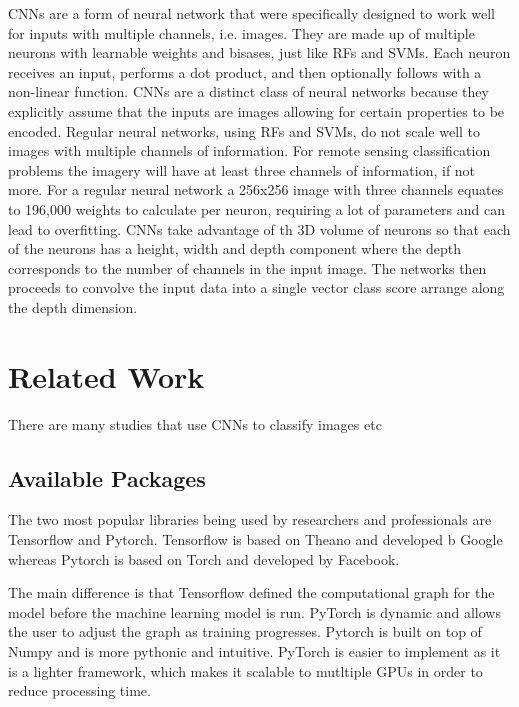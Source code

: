  \par
 CNNs are a form of neural network that were specifically designed to work well for inputs with multiple channels, i.e. images. They are made up of multiple neurons with learnable weights and bisases, just like RFs and SVMs. Each neuron receives an input, performs a dot product, and then optionally follows with a non-linear function. CNNs are a distinct class of neural networks because they explicitly assume that the inputs are images allowing for certain properties to be encoded. Regular neural networks, using RFs and SVMs, do not scale well to images with multiple channels of information. For remote sensing classification problems the imagery will have at least three channels of information, if not more. For a regular neural network a 256x256 image with three channels equates to 196,000 weights to calculate per neuron, requiring a lot of parameters and can lead to overfitting. CNNs take advantage of th 3D volume of neurons so that each of the neurons has a height, width and depth component where the depth corresponds to the number of channels in the input image. The networks then proceeds to convolve the input data into a single vector class score arrange along the depth dimension. 

\section*{Related Work}
There are many studies that use CNNs to classify images etc
\subsection*{Available Packages}
The two most popular libraries being used by researchers and professionals are Tensorflow and Pytorch. Tensorflow is based on Theano and developed b Google whereas Pytorch is based on Torch and developed by Facebook.
\par
The main difference is that Tensorflow defined the computational graph for the model before the machine learning model is run. PyTorch is dynamic and allows the user to adjust the graph as training progresses. Pytorch is built on top of Numpy and is more pythonic and intuitive. PyTorch is easier to implement as it is a lighter framework, which makes it scalable to mutltiple GPUs in order to reduce processing time.
